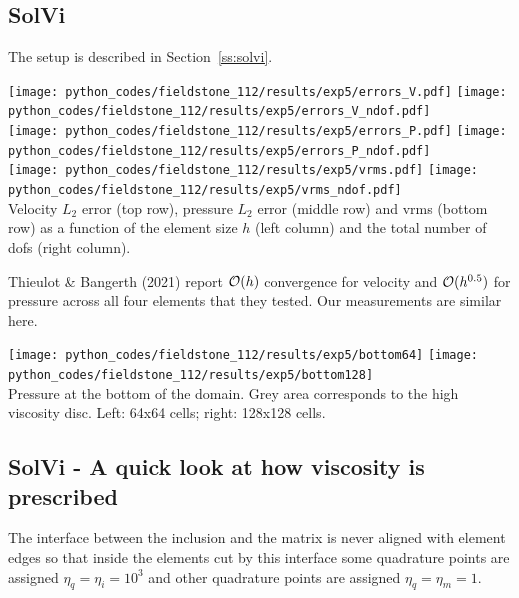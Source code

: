 \newpage
\subsection*{SolVi}

The setup is described in Section~\ref{ss:solvi}. 

\begin{center}
\texttt{[image: python\_codes/fieldstone\_112/results/exp5/errors\_V.pdf]}
\texttt{[image: python\_codes/fieldstone\_112/results/exp5/errors\_V\_ndof.pdf]}\\
\texttt{[image: python\_codes/fieldstone\_112/results/exp5/errors\_P.pdf]}
\texttt{[image: python\_codes/fieldstone\_112/results/exp5/errors\_P\_ndof.pdf]}\\
\texttt{[image: python\_codes/fieldstone\_112/results/exp5/vrms.pdf]}
\texttt{[image: python\_codes/fieldstone\_112/results/exp5/vrms\_ndof.pdf]}\\
{\captionfont Velocity $L_2$ error (top row), pressure $L_2$ error (middle row) and vrms (bottom row) 
as a function of the element size $h$ (left column) and the total number of dofs (right column).}
\end{center}

Thieulot \& Bangerth (2021) \cite{thba22} report ${\cal O}(h)$ convergence for 
velocity and ${\cal O}(h^{0.5})$ for pressure across all four elements that they tested.
Our measurements are similar here.


\begin{center}
\texttt{[image: python\_codes/fieldstone\_112/results/exp5/bottom64]}
\texttt{[image: python\_codes/fieldstone\_112/results/exp5/bottom128]}\\
{\captionfont Pressure at the bottom of the domain. Grey area corresponds to the 
high viscosity disc. Left: 64x64 cells; right: 128x128 cells.}
\end{center}

\newpage
\subsection*{SolVi - A quick look at how viscosity is prescribed}

The interface between the inclusion and the matrix is never aligned with 
element edges so that inside the elements cut by this interface some 
quadrature points are assigned $\eta_q=\eta_{i}=10^3$ and other 
quadrature points are assigned $\eta_q=\eta_{m}=1$. 

